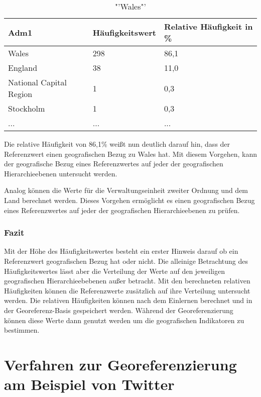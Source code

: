 			\begin{table}[h]
			\centering
			\caption{"'Wales"'}
			\label{tab:WalesVerw1}
			\begin{tabular}{|l|l|l|}
			\hline
			Adm1 & Häufigkeitswert & Relative Häufigkeit in \% \\ \hline \hline
			Wales                   & 298 & 86,1 \\ \hline
			England                 & 38  & 11,0 \\ \hline
			National Capital Region & 1   & 0,3  \\ \hline
			Stockholm               & 1   & 0,3  \\ \hline
			... & ... & ... \\ \hline
			\end{tabular}
			\end{table}  

			Die relative Häufigkeit von 86,1\% weißt nun deutlich darauf hin, dass der Referenzwert einen geografischen Bezug zu Wales hat.
			Mit diesem Vorgehen, kann der geografische Bezug eines Referenzwertes auf jeder der geografischen Hierarchieebenen untersucht werden.

			Analog können die Werte für die Verwaltungseinheit zweiter Ordnung und dem Land berechnet werden.
			Dieses Vorgehen ermöglicht es einen geografischen Bezug eines Referenzwertes auf jeder der geografischen Hierarchieebenen zu prüfen.

		\subsubsection{Fazit}

			Mit der Höhe des Häufigkeitswertes besteht ein erster Hinweis darauf ob ein Referenzwert geografischen Bezug hat oder nicht.
			Die alleinige Betrachtung des Häufigkeitswertes lässt aber die Verteilung der Werte auf den jeweiligen geografischen Hierarchieebebenen außer betracht.
			Mit den berechneten relativen Häufigkeiten können die Referenzwerte zusätzlich auf ihre Verteilung untersucht werden.
			Die relativen Häufigkeiten können nach dem Einlernen berechnet und in der Georeferenz-Basis gespeichert werden. 
			Während der Georeferenzierung können diese Werte dann genutzt werden um die geografischen Indikatoren zu bestimmen. 

	\section{Verfahren zur Georeferenzierung am Beispiel von Twitter}

